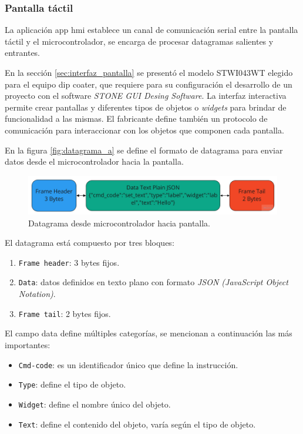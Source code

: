 \subsubsection{Pantalla táctil}

La aplicación app hmi establece un canal de comunicación serial entre la pantalla táctil y el microcontrolador, se encarga de procesar datagramas salientes y entrantes. 

En la sección \ref{sec:interfaz_pantalla} se presentó el modelo STWI043WT elegido para el equipo dip coater, que requiere para su configuración el desarrollo de un proyecto con el software \textit{STONE GUI Desing Software}. La interfaz interactiva permite crear pantallas y diferentes tipos de objetos o \textit{widgets} para brindar de funcionalidad a las mismas. El fabricante define también un protocolo de comunicación \citep{web_protocolo_stone} para interaccionar con los objetos que componen cada pantalla.




En la figura \ref{fig:datagrama_a} se define el formato de datagrama para enviar datos desde el microcontrolador hacia la pantalla. 

\begin{figure}[h!]
	\centering
	\includegraphics[width=1\textwidth]{./Figures/datagrama_b.jpg}
	\caption{Datagrama desde microcontrolador hacia pantalla.}
	\label{fig:datagrama_b}
\end{figure}

El datagrama está compuesto por tres bloques:
\begin{enumerate}
\item \texttt{Frame header}: 3 bytes fijos.
\item \texttt{Data}: datos definidos en texto plano con formato \textit{JSON (JavaScript Object Notation)}.
\item \texttt{Frame tail}: 2 bytes fijos.
\end{enumerate}

El campo data define múltiples categorías, se mencionan a continuación las más importantes:
\begin{itemize}
\item \texttt{Cmd-code}: es un identificador único que define la instrucción.
\item \texttt{Type}: define el tipo de objeto.
\item \texttt{Widget}: define el nombre único del objeto.
\item \texttt{Text}: define el contenido del objeto, varía según el tipo de objeto.
\end{itemize}  

